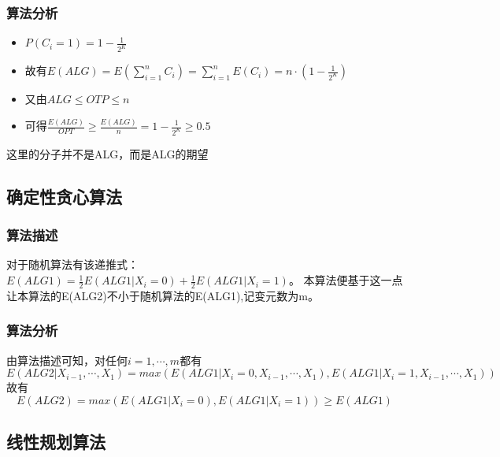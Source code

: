 \subsubsection{算法分析}
\begin{itemize}
	\item $P(C_i=1)=1-\frac{1}{2^K} $
	\item 故有$E(ALG)=E(\sum\limits_{i=1}^n C_i)=\sum\limits_{i=1}^n E(C_i)=n\cdot (1-\frac{1}{2^K})$
	\item 又由$ALG\leqslant OTP\leqslant n$
	\item 可得$\frac{E(ALG)}{OPT}\geqslant \frac{E(ALG)}{n}=1-\frac{1}{2^K}\geqslant 0.5$
\end{itemize}
\begin{remark}
	这里的分子并不是ALG，而是ALG的期望
\end{remark}

\subsection{确定性贪心算法}

\subsubsection{算法描述}

对于随机算法有该递推式：$E(ALG1)=\frac{1}{2}E(ALG1|X_i=0)+\frac{1}{2}E(ALG1|X_i=1)$。
本算法便基于这一点让本算法的E(ALG2)不小于随机算法的E(ALG1),记变元数为m。

\begin{algorithm}
\end{algorithm}

\subsubsection{算法分析}
由算法描述可知，对任何$i=1,\cdots,m$都有
\begin{displaymath}
	E(ALG2|X_{i-1},\cdots,X_1)=max(E(ALG1|X_i=0,X_{i-1},\cdots,X_1),E(ALG1|X_i=1,X_{i-1},\cdots,X_1))	
\end{displaymath}
故有
\begin{displaymath}
E(ALG2)=max(E(ALG1|X_i=0),E(ALG1|X_i=1))\geqslant E(ALG1)
\end{displaymath}

\subsection{线性规划算法}

